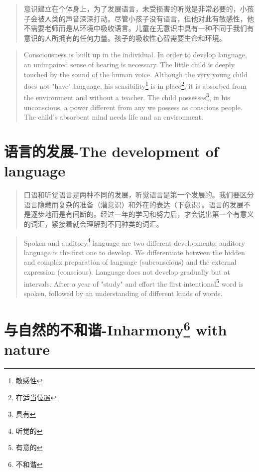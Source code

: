 \documentclass[lang=cn,10pt]{elegantbook}
\begin{document}
\begin{quote}
{\small 意识建立在个体身上，为了发展语言，未受损害的听觉是非常必要的，小孩子会被人类的声音深深打动。尽管小孩子没有语言，但他对此有敏感性，他不需要老师而是从环境中吸收语言。儿童在无意识中具有一种不同于我们有意识的人所拥有的任何力量。孩子的吸收性心智需要生命和环境。}
\end{quote}

\begin{tcolorbox}
\begin{quote}
{\small Consciousness is built up in the individual. In order to develop language, an unimpaired sense of hearing is necessary. The little child is deeply touched by the sound of the human voice. Although the very young child does not "have" language, his sensibility\footnote{敏感性} is in place\footnote{在适当位置}; it is absorbed from the environment and without a teacher. The child possesses\footnote{具有}, in his unconscious, a power different from any we possess as conscious people. The child's absorbent mind needs life and an environment.}
\end{quote}
\end{tcolorbox}

\chapter{语言的发展-The development of language}

\begin{quote}
{\small 口语和听觉语言是两种不同的发展，听觉语言是第一个发展的。我们要区分语言隐藏而复杂的准备（潜意识）和外在的表达（下意识）。语言的发展不是逐步地而是有间断的。经过一年的学习和努力后，才会说出第一个有意义的词汇，紧接着就会理解到不同种类的词汇。}
\end{quote}

\begin{tcolorbox}
\begin{quote}
{\small Spoken and auditory\footnote{听觉的} language are two different developments; auditory language is the first one to develop. We differentiate between the hidden and complex preparation of language (subconscious) and the external expression (conscious). Language does not develop gradually but at intervals. After a year of "study" and effort the first intentional\footnote{有意的} word is spoken, followed by an understanding of different kinds of words.}
\end{quote}
\end{tcolorbox}

\chapter{与自然的不和谐-Inharmony\footnote{不和谐} with nature}
\end{document}
